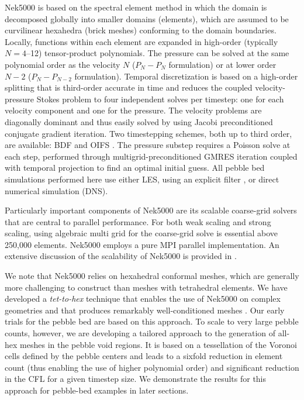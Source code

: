 Nek5000 is based on the spectral element method \cite{patera1984} in which  the domain is decomposed 
globally into smaller domains (elements), which are assumed to be curvilinear hexahedra (brick meshes) 
conforming to the domain boundaries. Locally, functions within each element are expanded in high-order
(typically $N=4$--12) tensor-product polynomials.
The pressure can be solved at the same polynomial order as the velocity $N$ ($P_{N} - P_{N}$ formulation)
or at lower order $N-2$ ($P_{N} - P_{N-2}$ formulation). 
Temporal discretization is based on a high-order splitting that is third-order
accurate in time and reduces the coupled velocity-pressure Stokes problem to
four independent solves per timestep: one for each velocity component and one
for the pressure. The velocity problems are diagonally dominant and thus easily
solved by using Jacobi preconditioned conjugate gradient iteration. Two
timestepping schemes, both up to third order, are available: BDF and OIFS
\cite{fischer2003implementation}. The pressure substep requires a Poisson solve
at each step, performed through multigrid-preconditioned GMRES iteration
coupled with temporal projection to find an optimal initial guess.
All pebble bed simulations performed here use either LES, 
using an explicit filter \cite{fischer2001filter}, or direct numerical simulation (DNS).


Particularly important components of Nek5000 are its scalable coarse-grid solvers that are central to
parallel performance. For both weak scaling and strong scaling, using algebraic multi grid for the
coarse-grid solve is essential above 250,000 elements. Nek5000 employs a pure MPI parallel implementation.
An extensive discussion of the scalability of Nek5000 is provided in \cite{fischer15,fischer20a}.

We note that Nek5000 relies on hexahedral conformal meshes, which are generally
more challenging to construct than meshes with tetrahedral elements.  We have
developed a \textit{tet-to-hex} technique that enables the use of Nek5000 on 
complex geometries and that produces remarkably well-conditioned meshes
\cite{yuan2020spectral}.  Our early trials for the pebble bed are based on this
approach.  To scale to very large pebble counts, however, we are developing a
tailored approach to the generation of all-hex meshes in the pebble void regions.
It is based on a tessellation of the Voronoi cells defined by the pebble
centers and leads to a sixfold reduction in element count (thus
enabling the use of higher polynomial order) and significant reduction in the
CFL for a given timestep size.  We demonstrate the results for this approach 
for pebble-bed examples in later sections.

